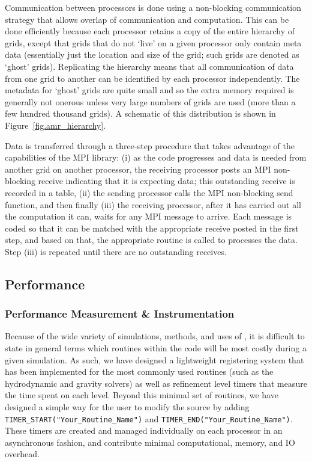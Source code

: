 Communication between processors is done using a non-blocking
communication strategy that allows overlap of communication and
computation.  This can be done efficiently because each processor
retains a copy of the entire hierarchy of grids, except that grids
that do not `live' on a given processor only contain meta data
(essentially just the location and size of the grid; such grids are denoted as
`ghost' grids).  Replicating the hierarchy means that all
communication of data from one grid to another can be identified by
each processor independently.  The metadata for `ghost' grids are
quite small and so the extra memory required is generally not onerous
unless very large numbers of grids are used (more than a few hundred
thousand grids).  A schematic of this distribution is shown in
Figure~\ref{fig.amr_hierarchy}.

Data is transferred through a three-step procedure that takes
advantage of the capabilities of the MPI library: (i) as the code
progresses and data is needed from another grid on another processor,
the receiving processor posts an MPI non-blocking receive indicating
that it is expecting data; this outstanding receive is recorded in a
table, (ii) the sending processor calls the MPI non-blocking send
function, and then finally (iii) the receiving processor, after it has
carried out all the computation it can, waits for any MPI message to
arrive.  Each message is coded so that it can be matched with the
appropriate receive posted in the first step, and based on that, the
appropriate routine is called to processes the data.  Step (iii) is
repeated until there are no outstanding receives.


\subsection{Performance}
\label{sec.performance}

\subsubsection{Performance Measurement \& Instrumentation}

Because of the wide variety of simulations, methods, and uses of \enzo,
it is difficult to state in general terms which routines within the
code will be most costly during a given simulation.  As such, we have
designed a lightweight registering system that has been implemented
for the most commonly used routines (such as the hydrodynamic and
gravity solvers) as well as refinement level timers that measure the
time spent on each level.  Beyond this minimal set of routines, we
have designed a simple way for the user to modify the source by adding
\texttt{TIMER\_START("Your\_Routine\_Name")} and
\texttt{TIMER\_END("Your\_Routine\_Name")}.  These timers are created
and managed individually on each processor in an asynchronous fashion,
and contribute minimal computational, memory, and IO overhead.


